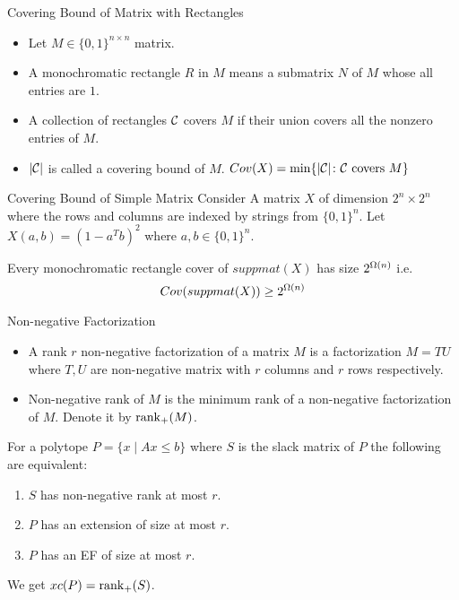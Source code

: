 \documentclass[aspectratio=1610, handout]{beamer}
\begin{document}
\begin{frame}{Covering Bound of Matrix with Rectangles}
	\begin{itemize}
		\item Let $M\in\{0,1\}^{n\times n}$ matrix. \pause\vspace*{5mm}
		
		\item A monochromatic rectangle $R$ in $M$ means a submatrix $N$ of $M$ whose all entries are $1$.\pause\vspace*{5mm}
		
		\item A collection of rectangles $\mathcal{C}$ covers $M$ if their union covers all the nonzero entries of $M$.\pause\vspace*{5mm}
		
		\item $|\mathcal{C}|$ is called a covering bound of $M$. $Cov(X)=\min\{|\mathcal{C}|\colon \mathcal{C}\text{ covers $M$}\}$
	\end{itemize}
\end{frame}

\begin{frame}{Covering Bound of Simple Matrix}
	Consider A matrix $X$ of dimension $2^n\times 2^n$ where the rows and columns are indexed by strings from $\{0,1\}^n$. Let $X(a,b)=(1-a^Tb)^2$ where $a,b\in\{0,1\}^n$.\pause\vspace*{5mm}
	
	\begin{theorem}
		Every monochromatic rectangle cover of $suppmat(X)$ has size $2^{\Omega(n)}$ i.e. $$Cov(suppmat(X))\geq 2^{\Omega(n)}$$
	\end{theorem}
\end{frame}

\begin{frame}{Non-negative Factorization}
	\begin{itemize}
		\item A rank $r$ non-negative factorization of a matrix $M$ is a factorization $M=TU$ where $T,U$ are non-negative matrix with $r$ columns and $r$ rows respectively.\pause
		
		\item Non-negative rank of $M$ is the minimum rank of a non-negative factorization of $M$. Denote it by $\operatorname{rank}_+(M)$.
	\end{itemize}\pause
		\begin{theorem}
		For a polytope $P=\{x\mid Ax\leq b\}$ where $S$ is the slack matrix of $P$ the following are equivalent:\begin{enumerate}[label=(\roman*)]
			\item $S$ has non-negative rank at most $r$.
			\item $P$ has an extension of size at most $r$.
			\item $P$ has an EF of size at most $r$.
		\end{enumerate}
	\end{theorem}
	
	We get $xc(P)=\operatorname{rank}_+(S)$.
\end{frame}
\end{document}
